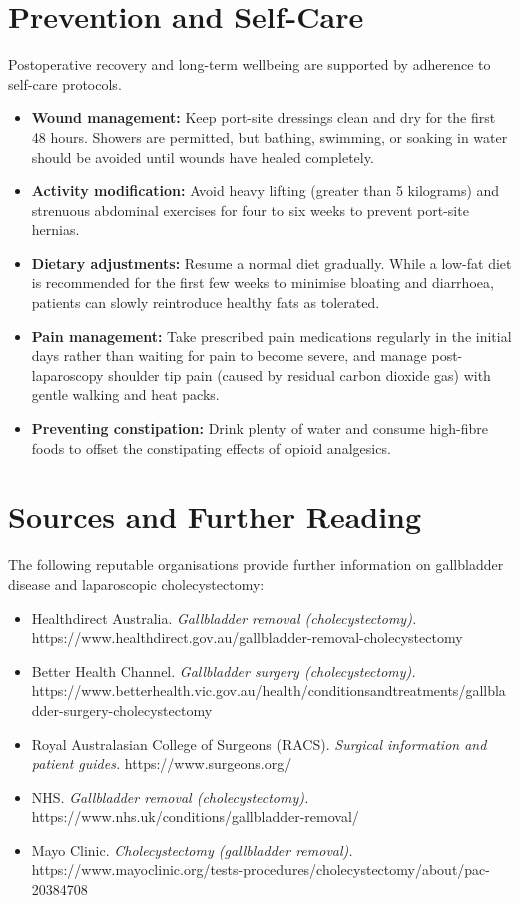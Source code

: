 \section*{Prevention and Self-Care}
Postoperative recovery and long-term wellbeing are supported by adherence to self-care protocols.
\begin{itemize}
    \item \textbf{Wound management:} Keep port-site dressings clean and dry for the first 48 hours. Showers are permitted, but bathing, swimming, or soaking in water should be avoided until wounds have healed completely.
    \item \textbf{Activity modification:} Avoid heavy lifting (greater than 5 kilograms) and strenuous abdominal exercises for four to six weeks to prevent port-site hernias.
    \item \textbf{Dietary adjustments:} Resume a normal diet gradually. While a low-fat diet is recommended for the first few weeks to minimise bloating and diarrhoea, patients can slowly reintroduce healthy fats as tolerated.
    \item \textbf{Pain management:} Take prescribed pain medications regularly in the initial days rather than waiting for pain to become severe, and manage post-laparoscopy shoulder tip pain (caused by residual carbon dioxide gas) with gentle walking and heat packs.
    \item \textbf{Preventing constipation:} Drink plenty of water and consume high-fibre foods to offset the constipating effects of opioid analgesics.
\end{itemize}

\section*{Sources and Further Reading}
The following reputable organisations provide further information on gallbladder disease and laparoscopic cholecystectomy:
\begin{itemize}
    \item Healthdirect Australia. \textit{Gallbladder removal (cholecystectomy).} https://www.healthdirect.gov.au/gallbladder-removal-cholecystectomy
    \item Better Health Channel. \textit{Gallbladder surgery (cholecystectomy).} https://www.betterhealth.vic.gov.au/health/conditionsandtreatments/gallbladder-surgery-cholecystectomy
    \item Royal Australasian College of Surgeons (RACS). \textit{Surgical information and patient guides.} https://www.surgeons.org/
    \item NHS. \textit{Gallbladder removal (cholecystectomy).} https://www.nhs.uk/conditions/gallbladder-removal/
    \item Mayo Clinic. \textit{Cholecystectomy (gallbladder removal).} https://www.mayoclinic.org/tests-procedures/cholecystectomy/about/pac-20384708
\end{itemize}
